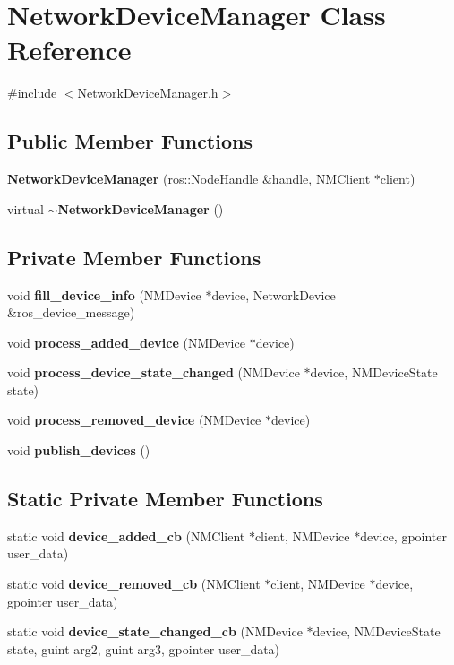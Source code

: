 \section{\-Network\-Device\-Manager \-Class \-Reference}
\label{classNetworkDeviceManager}


{\ttfamily \#include $<$\-Network\-Device\-Manager.\-h$>$}

\subsection*{\-Public \-Member \-Functions}
\begin{DoxyCompactItemize}
\item 
{\bf \-Network\-Device\-Manager} (ros\-::\-Node\-Handle \&handle, \-N\-M\-Client $\ast$client)
\item 
virtual {\bf $\sim$\-Network\-Device\-Manager} ()
\end{DoxyCompactItemize}
\subsection*{\-Private \-Member \-Functions}
\begin{DoxyCompactItemize}
\item 
void {\bf fill\-\_\-device\-\_\-info} (\-N\-M\-Device $\ast$device, \-Network\-Device \&ros\-\_\-device\-\_\-message)
\item 
void {\bf process\-\_\-added\-\_\-device} (\-N\-M\-Device $\ast$device)
\item 
void {\bf process\-\_\-device\-\_\-state\-\_\-changed} (\-N\-M\-Device $\ast$device, \-N\-M\-Device\-State state)
\item 
void {\bf process\-\_\-removed\-\_\-device} (\-N\-M\-Device $\ast$device)
\item 
void {\bf publish\-\_\-devices} ()
\end{DoxyCompactItemize}
\subsection*{\-Static \-Private \-Member \-Functions}
\begin{DoxyCompactItemize}
\item 
static void {\bf device\-\_\-added\-\_\-cb} (\-N\-M\-Client $\ast$client, \-N\-M\-Device $\ast$device, gpointer user\-\_\-data)
\item 
static void {\bf device\-\_\-removed\-\_\-cb} (\-N\-M\-Client $\ast$client, \-N\-M\-Device $\ast$device, gpointer user\-\_\-data)
\item 
static void {\bf device\-\_\-state\-\_\-changed\-\_\-cb} (\-N\-M\-Device $\ast$device, \-N\-M\-Device\-State state, guint arg2, guint arg3, gpointer user\-\_\-data)
\end{DoxyCompactItemize}
